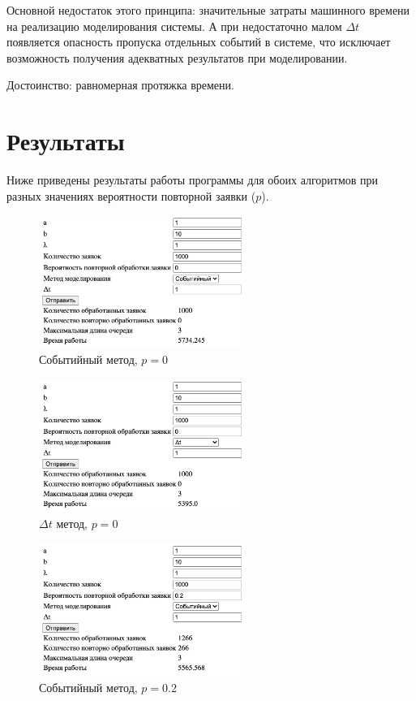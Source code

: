 Основной недостаток этого принципа: значительные затраты машинного времени на реализацию моделирования системы. А при недостаточно малом $\Delta t$ появляется опасность пропуска отдельных событий в системе, что исключает возможность получения адекватных результатов при моделировании.

Достоинство: равномерная протяжка времени.

\section{Результаты}

Ниже приведены результаты работы программы для обоих алгоритмов при разных значениях вероятности повторной заявки ($p$).

\begin{figure}[H]
    \centering
    \includegraphics[width=0.6\textwidth]{img/content/event_0.png}
    \caption{Событийный метод, $p = 0$}
\end{figure}

\begin{figure}[H]
    \centering
    \includegraphics[width=0.6\textwidth]{img/content/dt_0.png}
    \caption{$\Delta t$ метод, $p = 0$}
\end{figure}

\begin{figure}[H]
    \centering
    \includegraphics[width=0.6\textwidth]{img/content/event_2.png}
    \caption{Событийный метод, $p = 0.2$}
\end{figure}

